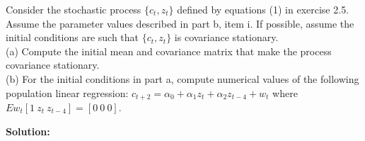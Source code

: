 \documentclass[12pt, letterpaper]{article}
\begin{document}
\begin{tcolorbox}[evenbox,title={Exercise 2.6 \quad Stationary Moments and a Population Regression}]
\begin{tcolorbox}[questionbox]
Consider the stochastic process $\{c_t,z_t\}$ defined by equations (1) in exercise 2.5. Assume the
parameter values described in part b, item i. If possible, assume the initial conditions are such
that $\{c_t,z_t\}$ is covariance stationary.\\[3pt]
(a) Compute the initial mean and covariance matrix that make the process covariance stationary.\\
(b) For the initial conditions in part a, compute numerical values of the following population
linear regression: $c_{t+2}=\alpha_0+\alpha_1z_t+\alpha_2z_{t-4}+w_t$ where
$Ew_t[1\ z_t\ z_{t-4}]=[0\ 0\ 0]$.
\end{tcolorbox}

\textbf{Solution:}


\end{tcolorbox}
\end{document}
